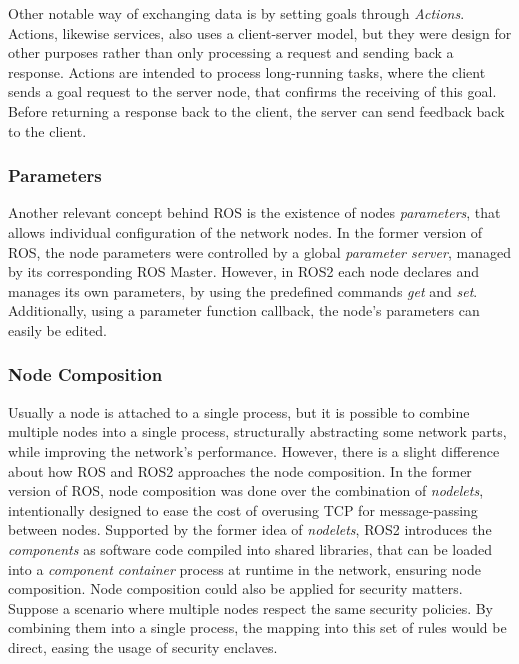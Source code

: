 Other notable way of exchanging data is by setting goals through \textit{Actions}. Actions, likewise services, also uses a client-server model, but they were design for other purposes rather than only processing a request and sending back a response. Actions are intended to process long-running tasks, where the client sends a goal request to the server node, that confirms the receiving of this goal. Before returning a response back to the client, the server can send feedback back to the client. %


\subsubsection{Parameters}   

Another relevant concept behind ROS is the existence of nodes \textit{parameters}, that allows individual configuration of the network nodes. In the former version of ROS, the node parameters were controlled by a global \textit{parameter server}, managed by its corresponding ROS Master. However, in ROS2 each node declares and manages its own parameters, by using the predefined commands \textit{get} and \textit{set}. Additionally, using a parameter function callback, the node's parameters can easily be edited.
        

\subsubsection{Node Composition}  

Usually a node is attached to a single process, but it is possible to combine multiple nodes into a single process, structurally abstracting some network parts, while improving the network's performance. However, there is a slight difference about how ROS and ROS2 approaches the node composition. In the former version of ROS, node composition was done over the combination of \textit{nodelets}, intentionally designed to ease the cost of overusing TCP for message-passing between nodes. Supported by the former idea of \textit{nodelets}, ROS2 introduces the \textit{components} as software code compiled into shared libraries, that can be loaded into a \textit{component container} process at runtime in the network, ensuring node composition. Node composition could also be applied for security matters. Suppose a scenario where multiple nodes respect the same security policies. By combining them into a single process, the mapping into this set of rules would be direct, easing the usage of security enclaves.
           

